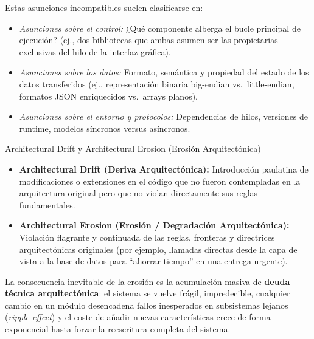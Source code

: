 Estas asunciones incompatibles suelen clasificarse en:
\begin{itemize}[leftmargin=1.5em]
  \item \emph{Asunciones sobre el control:} ¿Qué componente alberga el bucle principal de ejecución? (ej., dos bibliotecas que ambas asumen ser las propietarias exclusivas del hilo de la interfaz gráfica).
  \item \emph{Asunciones sobre los datos:} Formato, semántica y propiedad del estado de los datos transferidos (ej., representación binaria big-endian vs.\ little-endian, formatos JSON enriquecidos vs.\ arrays planos).
  \item \emph{Asunciones sobre el entorno y protocolos:} Dependencias de hilos, versiones de runtime, modelos síncronos versus asíncronos.
\end{itemize}

\begin{definicion}{Architectural Drift y Architectural Erosion (Erosión Arquitectónica)}
\begin{itemize}
  \item \textbf{Architectural Drift (Deriva Arquitectónica):} Introducción paulatina de modificaciones o extensiones en el código que no fueron contempladas en la arquitectura original pero que no violan directamente sus reglas fundamentales.
  \item \textbf{Architectural Erosion (Erosión / Degradación Arquitectónica):} Violación flagrante y continuada de las reglas, fronteras y directrices arquitectónicas originales (por ejemplo, llamadas directas desde la capa de vista a la base de datos para ``ahorrar tiempo'' en una entrega urgente).
\end{itemize}
\end{definicion}

La consecuencia inevitable de la erosión es la acumulación masiva de \textbf{deuda técnica arquitectónica}: el sistema se vuelve frágil, impredecible, cualquier cambio en un módulo desencadena fallos inesperados en subsistemas lejanos (\emph{ripple effect}) y el coste de añadir nuevas características crece de forma exponencial hasta forzar la reescritura completa del sistema.

